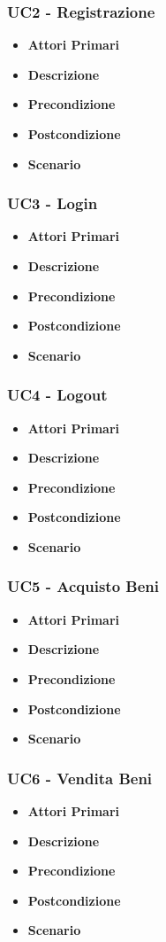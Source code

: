 \subsubsection{UC2 - Registrazione}
\begin{itemize}
	\item \textbf{Attori Primari}
	\item \textbf{Descrizione}
	\item \textbf{Precondizione}
	\item \textbf{Postcondizione}
	\item \textbf{Scenario}
\end{itemize}
\subsubsection{UC3 - Login}
\begin{itemize}
	\item \textbf{Attori Primari}
	\item \textbf{Descrizione}
	\item \textbf{Precondizione}
	\item \textbf{Postcondizione}
	\item \textbf{Scenario}
\end{itemize}
\subsubsection{UC4 - Logout}
\begin{itemize}
	\item \textbf{Attori Primari}
	\item \textbf{Descrizione}
	\item \textbf{Precondizione}
	\item \textbf{Postcondizione}
	\item \textbf{Scenario}
\end{itemize}
\subsubsection{UC5 - Acquisto Beni}
\begin{itemize}
	\item \textbf{Attori Primari}
	\item \textbf{Descrizione}
	\item \textbf{Precondizione}
	\item \textbf{Postcondizione}
	\item \textbf{Scenario}
\end{itemize}
\subsubsection{UC6 - Vendita Beni}
\begin{itemize}
	\item \textbf{Attori Primari}
	\item \textbf{Descrizione}
	\item \textbf{Precondizione}
	\item \textbf{Postcondizione}
	\item \textbf{Scenario}
\end{itemize}
